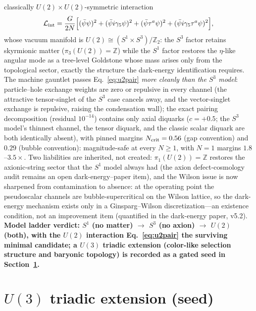 \documentclass[11pt,a4paper]{article}
\begin{document}
classically $U(2)\times U(2)$-symmetric interaction
\begin{equation}
\mathcal{L}_{\rm int} = \frac{G}{2N}\Bigl[(\bar\psi\psi)^2
+ (\bar\psi i\gamma_5\psi)^2
+ (\bar\psi\tau^a\psi)^2
+ (\bar\psi i\gamma_5\tau^a\psi)^2\Bigr],
\label{eq:u2pair}
\end{equation}
whose vacuum manifold is $U(2) \cong (S^1\times S^3)/\mathbb{Z}_2$:
the $S^3$ factor retains skyrmionic matter
($\pi_3(U(2)) = \mathbb{Z}$) while the $S^1$ factor restores the
$\eta$-like angular mode as a tree-level Goldstone whose mass
arises only from the topological sector, exactly the structure the
dark-energy identification requires.
The machine gauntlet passes Eq.~\eqref{eq:u2pair} \emph{more
cleanly than the $S^3$ model}: particle--hole exchange weights are
zero or repulsive in every channel (the attractive tensor-singlet
of the $S^3$ case cancels away, and the vector-singlet exchange is
repulsive, raising the condensation wall); the exact pairing
decomposition (residual $10^{-14}$) contains only axial diquarks
($c = +0.5$; the $S^3$ model's thinnest channel, the tensor
diquark, and the classic scalar diquark are both identically
absent), with pinned margins $N_{\rm crit} = 0.56$ (gap
convention) and $0.29$ (bubble convention): magnitude-safe at
every $N \geq 1$, with $N=1$ margins $1.8$--$3.5\times$.
Two liabilities are inherited, not created: $\pi_1(U(2)) =
\mathbb{Z}$ restores the axionic-string sector that the $S^1$
model always had (the axion defect-cosmology audit remains an
open dark-energy--paper item), and the Wilson issue is now sharpened from contamination to
absence: at the operating point the pseudoscalar channels are
bubble-supercritical on the Wilson lattice, so the dark-energy
mechanism exists only in a Ginsparg--Wilson discretization---an
existence condition, not an improvement item (quantified in the
dark-energy paper, v5.2).
\textbf{Model ladder verdict: $S^1$ (no matter) $\to$ $S^3$ (no
axion) $\to$ $U(2)$ (both), with the $U(2)$ interaction
Eq.~\eqref{eq:u2pair} the surviving minimal candidate; a $U(3)$
triadic extension (color-like selection structure and baryonic
topology) is recorded as a gated seed in
Section~\ref{sec:u3seed}.}


\section{$U(3)$ triadic extension (seed)}
\label{sec:u3seed}
\end{document}
